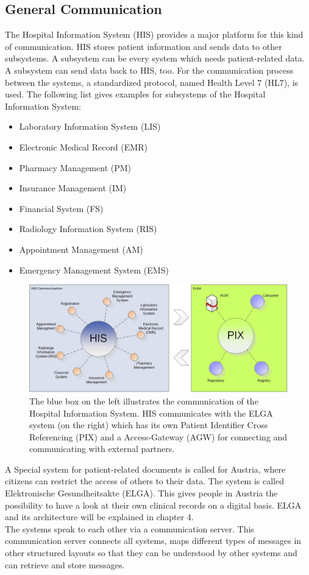 \documentclass[a4paper]{article}
\begin{document}
	\subsection{General Communication}
		The Hospital Information System (HIS) provides a major
		platform for this kind of communication. HIS stores patient information and
		sends data to other subsystems. A subsystem can be every system which needs
		patient-related data. A subsystem can send data back to HIS, too.
		For the communication  process between the systems, a standardized
		protocol, named Health Level 7 (HL7), is used. The following list gives
		examples for subsystems of the Hospital Information System:
		\begin{itemize}
	    	\item Laboratory Information System (LIS)
	    	\item Electronic Medical Record (EMR)
	    	\item Pharmacy Management (PM)
	    	\item Insurance Management (IM)
	    	\item Financial System (FS)
	    	\item Radiology Information System (RIS)
	    	\item Appointment Management (AM)
	    	\item Emergency Management System (EMS)
	    \end{itemize}
	    \begin{figure}[!ht]
		  \centering
		      \includegraphics[width=1.0\textwidth]{HIS_Overview}
		  \caption{The blue box on the left illustrates the communication of the
		  Hospital Information System. HIS  communicates with the ELGA system
		  (on the right) which has its own Patient Identifier Cross Referencing
		  (PIX) and a Access-Gateway (AGW) for connecting and communicating with
		  external partners.}
		\end{figure}
	    A Special system for patient-related documents is called for Austria,
	    where citizens can restrict the access of others to their data. The system
	    is called Elektronische Gesundheitsakte (ELGA).
	    This gives people in Austria the possibility to have a look at their
	    own clinical records on a digital basis. ELGA and its architecture will be
	    explained in chapter 4.\\
	    The systems speak to each other via a communication server.
	    This communication server connects all systems, maps different
	    types of messages in other structured layouts so that they can be
	    understood by other systems and can retrieve and store messages.
\end{document}
